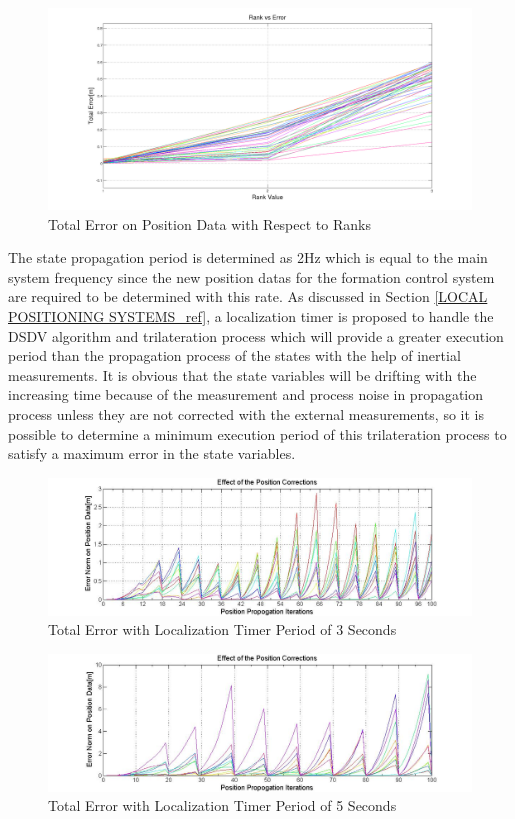 \begin{figure}[H]
\caption{Total Error on Position Data with Respect to Ranks} \label{cumulative_effect}
\centerline{\includegraphics[scale = 0.35]{rank_vs_error}}
\end{figure} 
	
The state propagation period is determined as 2Hz which is equal to the main system frequency since the new position datas for the formation control system are required to be determined with this rate. 	As discussed in Section \ref{LOCAL POSITIONING SYSTEMS_ref}, a localization timer is proposed to handle the DSDV algorithm and trilateration process which will provide a greater execution period than the propagation process of the states with the help of inertial measurements. It is obvious that the state variables will be drifting with the increasing time because of the measurement and process noise in propagation process unless they are not corrected with the external measurements, so it is possible to determine a minimum execution period of this trilateration process to satisfy a maximum error in the state variables. 
		
\begin{figure}[H]
\caption{Total Error with Localization Timer Period of 3 Seconds}
\centerline{\includegraphics[scale = 0.4]{Error-0,5Prop-3Update}}
\end{figure} 
		
\begin{figure}[H]
\caption{Total Error with Localization Timer Period of 5 Seconds}
\centerline{\includegraphics[scale = 0.4]{Error-0,5Prop-5Update}}
\end{figure} 


